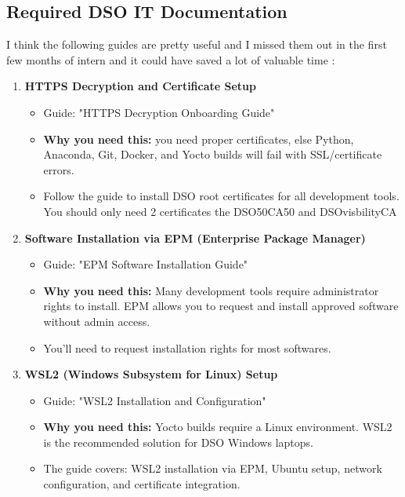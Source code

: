 \documentclass[12pt,a4paper]{report}
\begin{document}
\subsection{Required DSO IT Documentation}
I think the following guides are pretty useful and I missed them out in the first few months of intern and it could have saved a lot of valuable time :

\begin{enumerate}
    \item \textbf{HTTPS Decryption and Certificate Setup}
    \begin{itemize}
        \item Guide: "HTTPS Decryption Onboarding Guide"
        \item \textbf{Why you need this:} you need proper certificates, else Python, Anaconda, Git, Docker, and Yocto builds will fail with SSL/certificate errors.
        \item Follow the guide to install DSO root certificates for all development tools. You should only need 2 certificates the DSO50CA50 and DSOvisbilityCA 
    \end{itemize}
    
    \item \textbf{Software Installation via EPM (Enterprise Package Manager)}
    \begin{itemize}
        \item Guide: "EPM Software Installation Guide"
        \item \textbf{Why you need this:} Many development tools require administrator rights to install. EPM allows you to request and install approved software without admin access.
        \item You'll need to request installation rights for most softwares.
    \end{itemize}
    
    \item \textbf{WSL2 (Windows Subsystem for Linux) Setup}
    \begin{itemize}
        \item Guide: "WSL2 Installation and Configuration"
        \item \textbf{Why you need this:} Yocto builds require a Linux environment. WSL2 is the recommended solution for DSO Windows laptops.
        \item The guide covers: WSL2 installation via EPM, Ubuntu setup, network configuration, and certificate integration.
    \end{itemize}
\end{enumerate}
\end{document}
